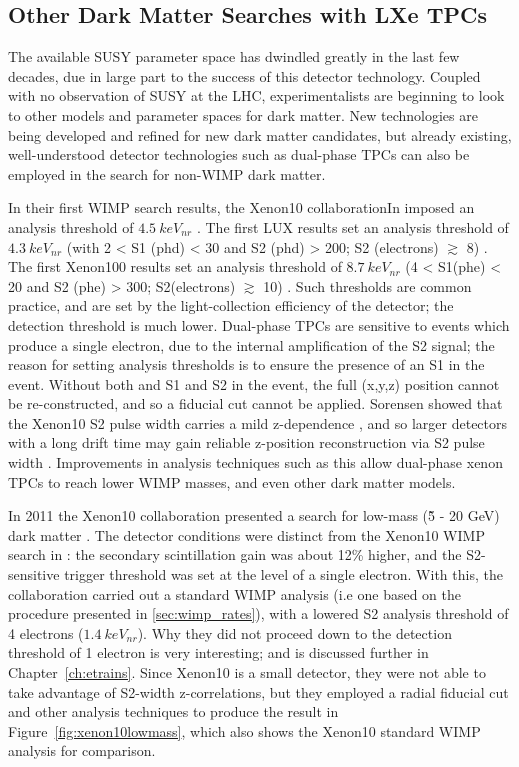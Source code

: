 \subsection{Other Dark Matter Searches with LXe TPCs}
\label{sec:non_wimp_searches_with_lxetpcs}
The available \ac{SUSY} parameter space has dwindled greatly in the last few decades, due in large part to the success of this detector technology. Coupled with no observation of \ac{SUSY} at the \ac{LHC}, experimentalists are beginning to look to other models and parameter spaces for dark matter. New technologies are being developed and refined for new dark matter candidates, but already existing, well-understood detector technologies such as dual-phase \ac{TPC}s can also be employed in the search for non-\ac{WIMP} dark matter. 

In their first \ac{WIMP} search results, the Xenon10 collaborationIn imposed an analysis threshold of $4.5~keV_{nr}$ \cite{Xenon10WIMP}. The first \ac{LUX} results set an analysis threshold of $4.3~keV_{nr}$ (with 2 < S1 (phd) < 30 and S2 (phd) > 200; S2 (electrons) $\gtrsim$ 8) \cite{LUXFirstResults}. The first Xenon100 results set an analysis threshold of $8.7~keV_{nr}$ (4 < S1(phe) < 20 and S2 (phe) > 300; S2(electrons) $\gtrsim$ 10) \cite{Xenon100FirstResults}. Such thresholds are common practice, and are set by the light-collection efficiency of the detector; the detection threshold is much lower. Dual-phase \ac{TPC}s are sensitive to events which produce a single electron, due to the internal amplification of the S2 signal; the reason for setting analysis thresholds is to ensure the presence of an S1 in the event. Without both and S1 and S2 in the event, the full (x,y,z) position cannot be re-constructed, and so a fiducial cut cannot be applied. Sorensen showed that the Xenon10 S2 pulse width carries a mild z-dependence \cite{Sorensen2010}, and so larger detectors with a long drift time may gain reliable z-position reconstruction via S2 pulse width \cite{SorensenS2Width}. Improvements in analysis techniques such as this allow dual-phase xenon \ac{TPC}s to reach lower \ac{WIMP} masses, and even other dark matter models. 

In 2011 the Xenon10 collaboration presented a search for low-mass (\~5 - 20 GeV) dark matter \cite{Angle2011}. The detector conditions were distinct from the Xenon10 \ac{WIMP} search in \cite{Xenon10WIMP}: the secondary scintillation gain was about 12\% higher, and the S2-sensitive trigger threshold was set at the level of a single electron. With this, the collaboration carried out a standard \ac{WIMP} analysis (i.e one based on the procedure presented in \ref{sec:wimp_rates}), with a lowered S2 analysis threshold of 4 electrons ($1.4~keV_{nr}$). Why they did not proceed down to the detection threshold of 1 electron is very interesting; and is discussed further in Chapter~\ref{ch:etrains}. Since Xenon10 is a small detector, they were not able to take advantage of S2-width z-correlations, but they employed a radial fiducial cut and other analysis techniques to produce the result in Figure~\ref{fig:xenon10lowmass}, which also shows the Xenon10 standard \ac{WIMP} analysis for comparison.

